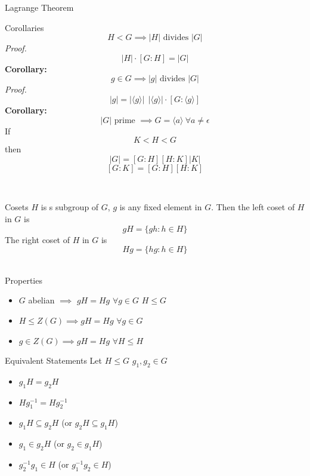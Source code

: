 \documentclass{article}
\begin{document}
\begin{multicols*}{3}
\begin{blackbox}{Lagrange Theorem}
\begin{bluebox}{Corollaries}
        \[H <  G \implies |H| \text{ divides } |G|\]
        \textit{Proof. } \\[-2ex]
        $$|H| \cdot [G : H]  = |G|$$
        \textbf{Corollary:}\\[-2ex]
        \[g \in G \implies |g| \text{ divides } |G|\]
        \textit{Proof. }\\[-2ex]
        \[|g| = |\langle {g} \rangle| \ \ |\langle {g} \rangle| \cdot [G : \langle {g} \rangle]\]
        \textbf{Corollary:}\\[-2ex]
        \[|G| \text{ prime } \implies G = \langle a \rangle \ \forall a \neq \epsilon\]
        If 
        \[K < H < G\]
        then 
        \[|G| = [G : H][H : K] |K|\]
        \[[G:K] = [G:H][H:K]\]
    \end{bluebox}\\[-2ex]
\end{blackbox}
\begin{blackbox}{Cosets}
    $H$ is s subgroup of $G$, $g$ is any fixed element in $G$. Then the left coset of $H$ in $G$ is 
    \[gH = \{gh: h \in H\}\]
    The right coset of $H$ in $G$ is 
    \[Hg = \{hg: h \in H\}\]\\[-6ex]
    \begin{redbox}{Properties}
    \begin{itemize}
        \item $G$ abelian $\implies$ $gH = Hg$ $\forall g \in G$ $H \leq G$
        \item $H \leq Z(G) \implies gH = Hg$ $\forall g \in G$
        \item $g \in Z(G) \implies gH = Hg$ $\forall H \leq H$  
    \end{itemize}
    \begin{bluebox}{Equivalent Statements}
        Let $H \leq G$ $g_1, g_2 \in G$
        \begin{itemize}
            \item $g_1H = g_2H$ 
            \item $Hg_1^{-1} = Hg_2^{-1}$
            \item $g_1H \subseteq g_2H$ (or $g_2H \subseteq g_1H$)
            \item $g_1 \in g_2H$ (or $g_2 \in g_1H$)
            \item $g_2^{-1}g_1 \in H$ (or $g_1^{-1}g_2 \in H$)
        \end{itemize}
    \end{bluebox}
    \end{redbox}\\[-2ex]
\end{blackbox}
\end{multicols*}
\end{document}
